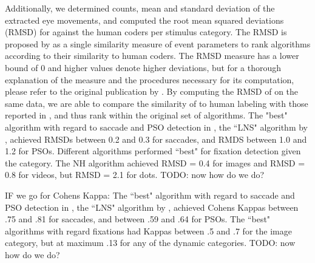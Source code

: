 

Additionally, we determined counts, mean and standard deviation of the extracted eye movements, and computed the root mean squared deviations (RMSD) for \remodnav against the human coders per stimulus category. The RMSD is proposed by \cite{Andersson2017} as a single similarity measure of event parameters to rank algorithms according to their similarity to human coders. The RMSD measure has a lower bound of 0 and higher values denote higher deviations, but for a thorough explanation of the measure and the procedures necessary for its computation, please refer to the original publication by \cite{Andersson2017}. By computing the RMSD of \remodnav on the same data, we are able to compare the similarity of \remodnav to human labeling with those reported in \cite{Andersson2017}, and thus rank \remodnav within the original set of algorithms. 
The "best" algorithm with regard to saccade and PSO detection in \cite{Andersson2017}, the ``LNS" algorithm by \cite{Larsson2013}, achieved RMSDs between 0.2 and 0.3 for saccades, and RMDS between 1.0 and 1.2 for PSOs. Different algorithms performed ``best" for fixation detection given the category. The NH algorithm achieved RMSD = 0.4 for images and RMSD = 0.8 for videos, but RMSD = 2.1 for dots. TODO: now how do we do?

IF we go for Cohens Kappa: The ``best" algorithm with regard to saccade and PSO detection in \cite{Andersson2017}, the ``LNS" algorithm by \cite{Larsson2013}, achieved Cohens Kappas between .75 and .81 for saccades, and between .59 and .64 for PSOs. The ``best" algorithms with regard fixations had Kappas between .5 and .7 for the image category, but at maximum .13 for any of the dynamic categories. TODO: now how do we do? \\

